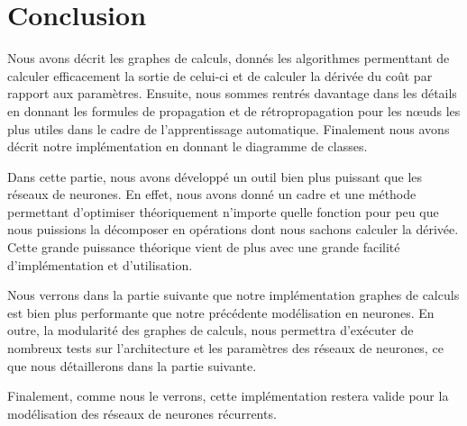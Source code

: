 \section{Conclusion}

Nous avons décrit les graphes de calculs, donnés les algorithmes permenttant de calculer efficacement la sortie de celui-ci et de calculer la dérivée du coût par rapport aux paramètres. Ensuite, nous sommes rentrés davantage dans les détails en donnant les formules de propagation et de rétropropagation pour les n\oe{}uds les plus utiles dans le cadre de l'apprentissage automatique. Finalement nous avons décrit notre implémentation en donnant le diagramme de classes.

Dans cette partie, nous avons développé un outil bien plus puissant que les réseaux de neurones. En effet, nous avons donné un cadre et une méthode permettant d'optimiser théoriquement n'importe quelle fonction pour peu que nous puissions la décomposer en opérations dont nous sachons calculer la dérivée. Cette grande puissance théorique vient de plus avec une grande facilité d'implémentation et d'utilisation.

Nous verrons dans la partie suivante que notre implémentation graphes de calculs est bien plus performante que notre précédente modélisation en neurones. En outre, la modularité des graphes de calculs, nous permettra d'exécuter de nombreux tests sur l'architecture et les paramètres des réseaux de neurones, ce que nous détaillerons dans la partie suivante.

Finalement, comme nous le verrons, cette implémentation restera valide pour la modélisation des réseaux de neurones récurrents.